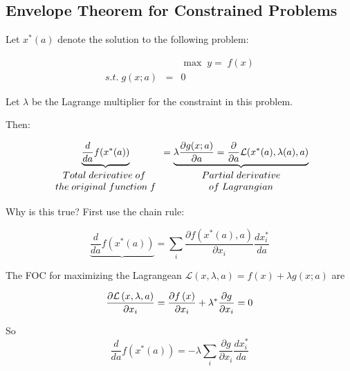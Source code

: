 \documentclass[11pt,english]{article}
\begin{document}
\subsection{Envelope Theorem for Constrained Problems}

Let $x^{\ast }(a)$ denote the solution to the following problem:

\begin{eqnarray*}
&&\max \;y=\;f(x) \\
s.t.\;g(x;a) &=&0
\end{eqnarray*}

Let $\lambda $ be the Lagrange multiplier for the constraint in this problem.

Then:

\begin{equation*}
\underset{%
\begin{array}{c}
Total\;derivative\;of\; \\ 
the\;original\;function\;f%
\end{array}%
}{\underbrace{\frac{d}{da}f(x^{\ast }(a))}}=\underset{%
\begin{array}{c}
Partial\;derivative \\ 
of\;Lagrangian%
\end{array}%
}{\underbrace{\lambda \frac{\partial g(x;a)}{\partial a}=\frac{\partial }{%
\partial a}\mathcal{L} (x^{\ast }(a),\lambda (a),a)}}
\end{equation*}

Why is this true? First use the chain rule:

\begin{equation*}
\underbrace{\frac{d}{da}f(x^{\ast }(a))}=\sum_{i}\frac{\partial f(x^{\ast
}(a),a)}{\partial x_{i}}\frac{dx_{i}^{\ast }}{da}
\end{equation*}

\bigskip The FOC for maximizing the Lagrangean $\mathcal{L} \left( x,\lambda
,a\right) =f(x)+\lambda g(x;a)$ are

\begin{equation*}
\frac{\partial \mathcal{L} \left( x,\lambda ,a\right) }{\partial x_{i}}=%
\frac{\partial f\left( x\right) }{\partial x_{i}}+\lambda ^{\ast }\frac{%
\partial g}{\partial x_{i}}=0
\end{equation*}

\bigskip So%
\begin{equation*}
\frac{d}{da}f(x^{\ast }(a))=-\lambda \sum_{i}\frac{\partial g}{\partial
x_{i}}\frac{dx_{i}^{\ast }}{da}
\end{equation*}
\end{document}
